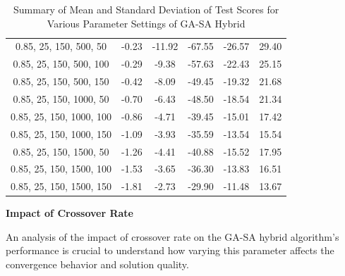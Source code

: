 \documentclass[
]{article}
\begin{document}
\begin{table}[H]
{\begin{tabular}{|c|c|c|c|c|c|}
                0.85, 25, 150, 500, 50     & -0.23                      & -11.92                     & -67.55                     & -26.57                   & 29.40                   \\
                0.85, 25, 150, 500, 100    & -0.29                      & -9.38                      & -57.63                     & -22.43                   & 25.15                   \\
                0.85, 25, 150, 500, 150    & -0.42                      & -8.09                      & -49.45                     & -19.32                   & 21.68                   \\
                0.85, 25, 150, 1000, 50    & -0.70                      & -6.43                      & -48.50                     & -18.54                   & 21.34                   \\
                0.85, 25, 150, 1000, 100   & -0.86                      & -4.71                      & -39.45                     & -15.01                   & 17.42                   \\
                0.85, 25, 150, 1000, 150   & -1.09                      & -3.93                      & -35.59                     & -13.54                   & 15.54                   \\
                0.85, 25, 150, 1500, 50    & -1.26                      & -4.41                      & -40.88                     & -15.52                   & 17.95                   \\
                0.85, 25, 150, 1500, 100   & -1.53                      & -3.65                      & -36.30                     & -13.83                   & 16.51                   \\
                0.85, 25, 150, 1500, 150   & -1.81                      & -2.73                      & -29.90                     & -11.48                   & 13.67                   \\
                \hline
            \end{tabular}
        }
        \caption{Summary of Mean and Standard Deviation of Test Scores for Various Parameter Settings of GA-SA Hybrid}
        \label{tab:gasa_summary_test_scores}
    \end{table}


    \textbf{Impact of Crossover Rate}

    An analysis of the impact of crossover rate on the GA-SA hybrid algorithm’s performance is crucial to understand how varying this parameter affects the convergence behavior and solution quality.
\end{document}
